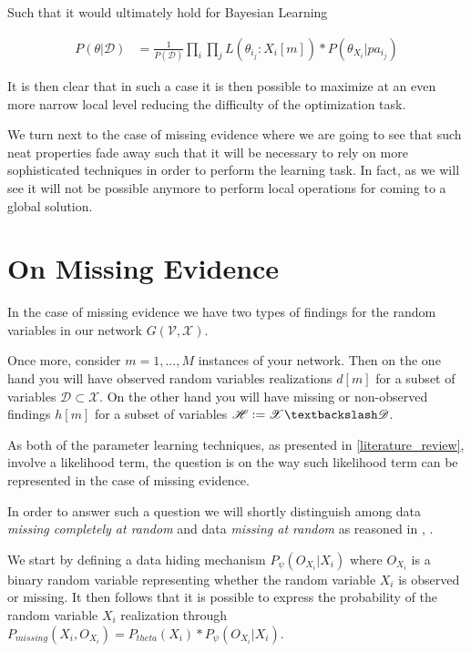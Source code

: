 \documentclass[11pt]{article}
\begin{document}
\begin{article}
Such that it would ultimately hold for Bayesian Learning

\begin{align} 
P(\theta | \mathscr{D}) &= \frac{1}{P(\mathscr{D})} \prod_i \prod_j L(\theta_i_j : X_i[m]) * P(\theta_{X_i}|pa_i_j) \nonumber
\end{align}

It is then clear that in such a case it is then possible to
maximize at an even more narrow local level reducing the difficulty
of the optimization task.

We turn next to the case of missing evidence where we are going to
see that such neat properties fade away such that it will be
necessary to rely on more sophisticated techniques in order to
perform the learning task. In fact, as we will see it will not be
possible anymore to perform local operations for coming to a global
solution.

\section{On Missing Evidence}
\label{sec:org90a0574}

In the case of missing evidence we have two types of findings for
the random variables in our network \(G(\mathscr{V}, \mathscr{X})\).

Once more, consider \(m = 1, ..., M\) instances of your network. Then
on the one hand you will have observed random variables realizations
\(d[m]\) for a subset of variables \(\mathscr{D} \subset
  \mathscr{X}\). On the other hand you will have missing or
non-observed findings \(h[m]\) for a subset of variables
\(\mathscr{H} \vcentcolon= \mathscr{X} \textbackslash \mathscr{D}\).

As both of the parameter learning techniques, as presented in
\ref{literature_review}, involve a likelihood term, the question is on
the way such likelihood term can be represented in the case of
missing evidence.

In order to answer such a question we will shortly distinguish among
data \emph{missing completely at random} and data \emph{missing at random} as
reasoned in \cite{little1976inference}, \cite{rubin1976inference}.

We start by defining a data hiding mechanism \(P_\psi(O_{X_i}|X_i)\) where
\(O_{X_i}\) is a binary random variable representing whether the
random variable \(X_i\) is observed or missing. It then follows that
it is possible to express the probability of the random variable
\(X_i\) realization through \(P_{missing}(X_i, O_{X_i}) = P_{theta}(X_i) *
  P_\psi(O_{X_i}|X_i)\).


\end{article}
\end{document}
